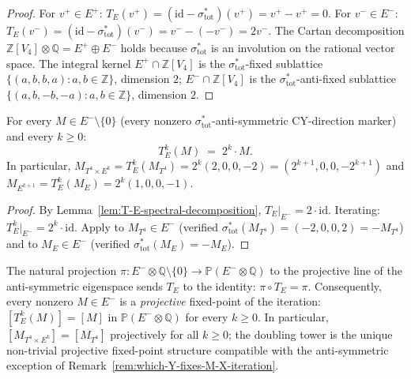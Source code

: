 \begin{proof}
For $v^+ \in E^+$: $T_E(v^+) = (\mathrm{id} - \sigma_{\mathrm{tot}}^*)(v^+) = v^+ - v^+ = 0$.
For $v^- \in E^-$: $T_E(v^-) = (\mathrm{id} - \sigma_{\mathrm{tot}}^*)(v^-) = v^- - (-v^-) = 2v^-$.
The Cartan decomposition $\mathbb{Z}[V_4] \otimes \mathbb{Q} = E^+ \oplus E^-$
holds because $\sigma_{\mathrm{tot}}^*$ is an involution on the rational
vector space. The integral kernel $E^+ \cap \mathbb{Z}[V_4]$ is the
$\sigma_{\mathrm{tot}}^*$-fixed sublattice
$\{(a, b, b, a) : a, b \in \mathbb{Z}\}$, dimension $2$;
$E^- \cap \mathbb{Z}[V_4]$ is the $\sigma_{\mathrm{tot}}^*$-anti-fixed
sublattice $\{(a, b, -b, -a) : a, b \in \mathbb{Z}\}$, dimension $2$.
\end{proof}

\begin{theorem}
\label{thm:doubling-tower-anti-symmetric}
For every $M \in E^- \setminus \{0\}$ \textup{(}every nonzero
$\sigma_{\mathrm{tot}}^*$-anti-symmetric CY-direction marker\textup{)} and
every $k \geq 0$:
\[
 T_E^k(M) \;=\; 2^k \cdot M.
\]
In particular, $M_{T^4 \times E^k} = T_E^k(M_{T^4}) = 2^k (2, 0, 0, -2) =
(2^{k+1}, 0, 0, -2^{k+1})$ and
$M_{E^{k+1}} = T_E^k(M_E) = 2^k (1, 0, 0, -1)$.
\end{theorem}

\begin{proof}
By Lemma~\ref{lem:T-E-spectral-decomposition},
$T_E\big|_{E^-} = 2 \cdot \mathrm{id}$. Iterating:
$T_E^k\big|_{E^-} = 2^k \cdot \mathrm{id}$. Apply to $M_{T^4} \in E^-$
(verified $\sigma_{\mathrm{tot}}^*(M_{T^4}) = (-2, 0, 0, 2) = -M_{T^4}$)
and to $M_E \in E^-$ (verified
$\sigma_{\mathrm{tot}}^*(M_E) = -M_E$).
\end{proof}

\begin{corollary}
\label{cor:projective-fixed-point-anti-symmetric}
The natural projection
$\pi \colon E^- \otimes \mathbb{Q} \setminus \{0\} \to
\mathbb{P}(E^- \otimes \mathbb{Q})$ to the projective line of the
anti-symmetric eigenspace sends $T_E$ to the identity:
$\pi \circ T_E = \pi$. Consequently, every nonzero
$M \in E^-$ is a \emph{projective} fixed-point of the iteration:
$[T_E^k(M)] = [M]$ in $\mathbb{P}(E^- \otimes \mathbb{Q})$ for every
$k \geq 0$. In particular,
$[M_{T^4 \times E^k}] = [M_{T^4}]$ projectively for all $k \geq 0$;
the doubling tower is the unique non-trivial projective fixed-point
structure compatible with the anti-symmetric exception of
Remark~\ref{rem:which-Y-fixes-M-X-iteration}.
\end{corollary}

